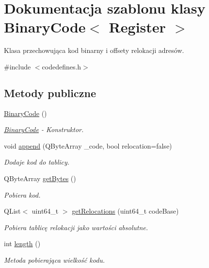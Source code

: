 \hypertarget{class_binary_code}{\section{Dokumentacja szablonu klasy Binary\-Code$<$ Register $>$}
\label{class_binary_code}
}


Klasa przechowująca kod binarny i offsety relokacji adresów.  




{\ttfamily \#include $<$codedefines.\-h$>$}

\subsection*{Metody publiczne}
\begin{DoxyCompactItemize}
\item 
\hyperlink{class_binary_code_aa21721fc16b2e943be048fa3ceea300d}{Binary\-Code} ()
\begin{DoxyCompactList}\small\item\em \hyperlink{class_binary_code}{Binary\-Code} -\/ Konstruktor. \end{DoxyCompactList}\item 
void \hyperlink{class_binary_code_a5f06f08736f891d6bc6d2d4fc93dca21}{append} (Q\-Byte\-Array \-\_\-code, bool relocation=false)
\begin{DoxyCompactList}\small\item\em Dodaje kod do tablicy. \end{DoxyCompactList}\item 
Q\-Byte\-Array \hyperlink{class_binary_code_a0b9f52a511f1ba6989412d4424885f8f}{get\-Bytes} ()
\begin{DoxyCompactList}\small\item\em Pobiera kod. \end{DoxyCompactList}\item 
Q\-List$<$ uint64\-\_\-t $>$ \hyperlink{class_binary_code_a16f19ea25857126aeaeb7993890a5ad3}{get\-Relocations} (uint64\-\_\-t code\-Base)
\begin{DoxyCompactList}\small\item\em Pobiera tablicę relokacji jako wartości absolutne. \end{DoxyCompactList}\item 
int \hyperlink{class_binary_code_a08ecf07ca01749c097929dc394871e6e}{length} ()
\begin{DoxyCompactList}\small\item\em Metoda pobierająca wielkość kodu. \end{DoxyCompactList}\end{DoxyCompactItemize}
